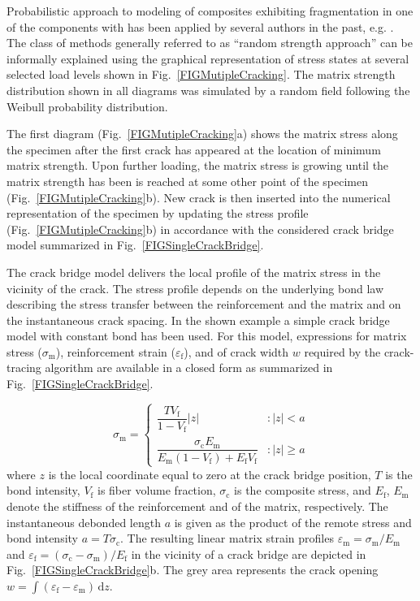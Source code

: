 \documentclass[main.tex]{subfiles}
\begin{document}
Probabilistic approach to modeling of composites exhibiting fragmentation in one of the components with has been applied by several authors in the past, e.g. \cite{avekel:73,huiphoibn:95}.
The class of methods generally referred to as ``random strength approach'' \cite{casgellac:10}
can be informally explained using the graphical representation of stress states at several selected load levels shown in Fig.~\ref{FIGMutipleCracking}. The matrix strength distribution shown in all diagrams was simulated by a random field following the Weibull probability distribution.

The first diagram (Fig.~\ref{FIGMutipleCracking}a) shows the matrix stress along the specimen after the first crack has appeared at the location of minimum matrix strength. Upon further loading, the matrix stress is growing until the matrix strength has been is reached at some other point of the specimen (Fig.~\ref{FIGMutipleCracking}b). New crack is then inserted into the numerical representation of the specimen by updating the stress profile (Fig.~\ref{FIGMutipleCracking}b) in accordance with the considered crack bridge model summarized in Fig.~\ref{FIGSingleCrackBridge}.

The crack bridge model delivers the local profile of the matrix stress in the vicinity of the crack. The stress profile depends on the underlying bond law describing the stress transfer between the reinforcement and the matrix and on the instantaneous crack spacing. In the shown example a simple crack bridge model with constant bond has been used. For this model, expressions for matrix stress ($\sigma_\mathrm{m}$), reinforcement strain ($\varepsilon_\mathrm{f}$), and of crack width $w$ required by the crack-tracing algorithm are available in a closed form as summarized in Fig.~\ref{FIGSingleCrackBridge}.

%
\begin{equation} \label{eq: simple_cb_stress}
\sigma_{\mathrm{m}}=
\begin{cases}
\dfrac{TV_{\mathrm{f}}}{1-V_{\mathrm{f}}}|z|  & : |z|<a \\
\dfrac{\sigma_\mathrm{c} E_{\mathrm{m}}}{E_{\mathrm{m}}(1-V_{\mathrm{f}})+E_{\mathrm{f}}V_{\mathrm{f}}} & : |z| \ge a
\end{cases}
\end{equation}
where $z$ is the local coordinate equal to zero at the crack bridge position, $T$ is the bond intensity, $V_{\mathrm{f}}$ is fiber volume fraction, $\sigma_\mathrm{c}$ is the composite stress, and $E_{\mathrm{f}}$, $E_{\mathrm{m}}$ denote the stiffness of the reinforcement and of the matrix, respectively.
The instantaneous debonded length $a$ is given as the product of the remote stress and bond intensity $a = T \sigma_{\mathrm{c}}$.
The resulting linear matrix strain profiles $\varepsilon_{\mathrm{m}} = \sigma_{\mathrm{m}} / E_{\mathrm{m}}$ and $\varepsilon_{\mathrm{f}} = (\sigma_{\mathrm{c}} - \sigma_{\mathrm{m}} ) / E_{\mathrm{f}}$ in the vicinity of a crack bridge are depicted in Fig.~\ref{FIGSingleCrackBridge}b. The grey area represents the crack opening $w = \int (\varepsilon_{\mathrm{f}} - \varepsilon_{\mathrm{m}}) \, \mathrm{d}z$.
\end{document}
